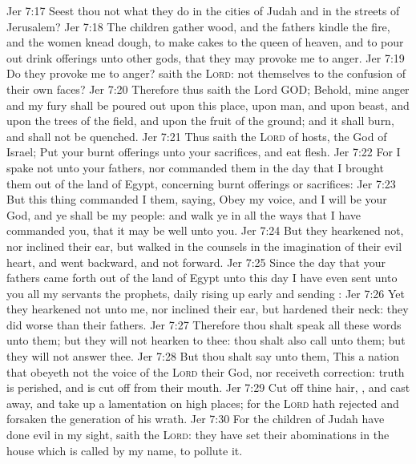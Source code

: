 \vs Jer 7:17 Seest thou not what they do in the cities of Judah and in the streets of Jerusalem?
\vs Jer 7:18 The children gather wood, and the fathers kindle the fire, and the women knead  dough, to make cakes to the queen of heaven, and to pour out drink offerings unto other gods, that they may provoke me to anger.
\vs Jer 7:19 Do they provoke me to anger? saith the \textsc{Lord}:  not  themselves to the confusion of their own faces?
\vs Jer 7:20 Therefore thus saith the Lord GOD; Behold, mine anger and my fury shall be poured out upon this place, upon man, and upon beast, and upon the trees of the field, and upon the fruit of the ground; and it shall burn, and shall not be quenched.
\vs Jer 7:21 Thus saith the \textsc{Lord} of hosts, the God of Israel; Put your burnt offerings unto your sacrifices, and eat flesh.
\vs Jer 7:22 For I spake not unto your fathers, nor commanded them in the day that I brought them out of the land of Egypt, concerning burnt offerings or sacrifices:
\vs Jer 7:23 But this thing commanded I them, saying, Obey my voice, and I will be your God, and ye shall be my people: and walk ye in all the ways that I have commanded you, that it may be well unto you.
\vs Jer 7:24 But they hearkened not, nor inclined their ear, but walked in the counsels  in the imagination of their evil heart, and went backward, and not forward.
\vs Jer 7:25 Since the day that your fathers came forth out of the land of Egypt unto this day I have even sent unto you all my servants the prophets, daily rising up early and sending :
\vs Jer 7:26 Yet they hearkened not unto me, nor inclined their ear, but hardened their neck: they did worse than their fathers.
\vs Jer 7:27 Therefore thou shalt speak all these words unto them; but they will not hearken to thee: thou shalt also call unto them; but they will not answer thee.
\vs Jer 7:28 But thou shalt say unto them, This  a nation that obeyeth not the voice of the \textsc{Lord} their God, nor receiveth correction: truth is perished, and is cut off from their mouth.
\vs Jer 7:29 Cut off thine hair, , and cast  away, and take up a lamentation on high places; for the \textsc{Lord} hath rejected and forsaken the generation of his wrath.
\vs Jer 7:30 For the children of Judah have done evil in my sight, saith the \textsc{Lord}: they have set their abominations in the house which is called by my name, to pollute it.
